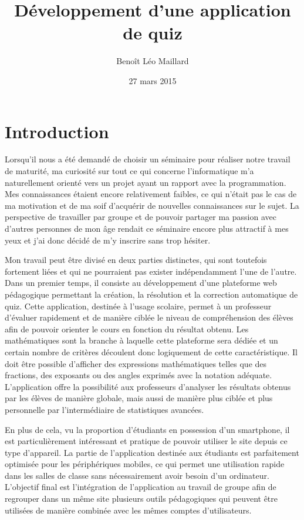 \documentclass[a4,10pt,french]{sphinxmanual}
\title{Développement d'une application de quiz}
\date{27 mars 2015}
\author{Benoît Léo Maillard}
\begin{document}
\maketitle
\tableofcontents
{}\label{index::doc}



\chapter{Introduction}
\label{introduction::doc}\label{introduction:introduction}\label{introduction:application-de-creation-de-quiz}
Lorsqu'il nous a été demandé de choisir un séminaire pour réaliser notre travail de maturité,
ma curiosité sur tout ce qui concerne l'informatique m'a naturellement orienté
vers un projet ayant un rapport avec la programmation. Mes connaissances étaient
encore relativement faibles, ce qui n'était pas le cas de ma motivation et de ma
soif d'acquérir de nouvelles connaissances sur le sujet. La perspective de travailler
par groupe et de pouvoir partager ma passion avec d'autres personnes de mon âge rendait
ce séminaire encore plus attractif à mes yeux et j'ai donc décidé de m'y inscrire
sans trop hésiter.

Mon travail peut être divisé en deux parties distinctes, qui sont toutefois fortement
liées et qui ne pourraient pas exister indépendamment l'une de l'autre. Dans un premier
temps, il consiste au développement d'une plateforme web pédagogique permettant
la création, la résolution et la correction automatique de quiz. Cette application,
destinée à l'usage scolaire, permet à un professeur d'évaluer rapidement et de
manière ciblée le niveau de compréhension des élèves afin de pouvoir orienter
le cours en fonction du résultat obtenu. Les mathématiques sont la branche à laquelle
cette plateforme sera dédiée et un certain nombre de critères découlent donc logiquement
de cette caractéristique. Il doit être possible d'afficher des expressions mathématiques
telles que des fractions, des exposants ou des angles exprimés avec la notation adéquate.
L'application offre la possibilité aux professeurs d'analyser les résultats
obtenus par les élèves de manière globale, mais aussi de manière plus ciblée et plus
personnelle par l'intermédiaire de statistiques avancées.

En plus de cela, vu la proportion d'étudiants en possession d'un smartphone, il est
particulièrement intéressant et pratique de pouvoir utiliser le site depuis ce type
d'appareil. La partie de l'application destinée aux étudiants est parfaitement optimisée pour
les périphériques mobiles, ce qui permet une utilisation rapide dans les salles de
classe sans nécessairement avoir besoin d'un ordinateur. L'objectif final est l'intégration
de l'application au travail de groupe afin de regrouper dans un même site plusieurs outils
pédagogiques qui peuvent être utilisées de manière combinée avec les mêmes comptes d'utilisateurs.
\end{document}
